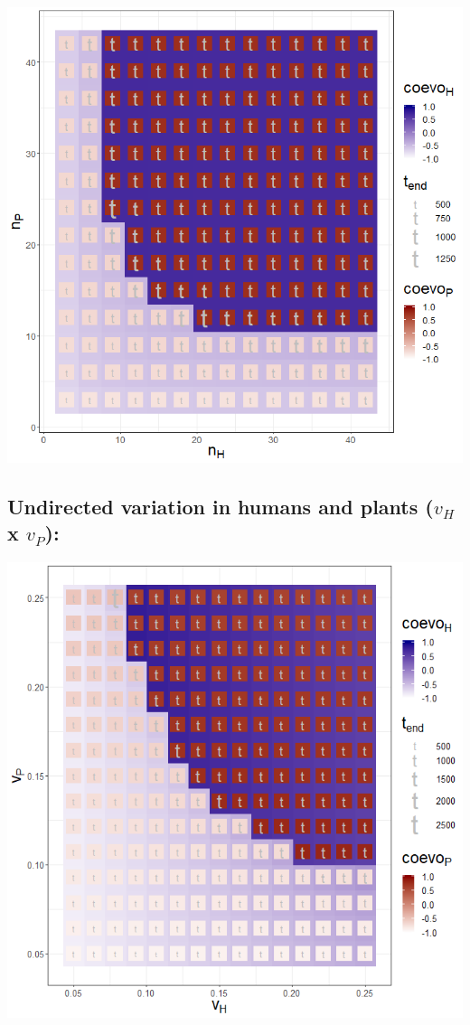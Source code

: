 \documentclass[]{book}
\begin{document}
\includegraphics[width=1\linewidth]{plots/3_twoPar-n.H-n.P_plot}

\newpage

\hypertarget{undirected-variation-in-humans-and-plants-v_h-x-v_p}{%
\subsection{\texorpdfstring{Undirected variation in humans and plants (\(v_{H}\) x \(v_{P}\)):}{Undirected variation in humans and plants (v\_\{H\} x v\_\{P\}):}}\label{undirected-variation-in-humans-and-plants-v_h-x-v_p}}

\includegraphics[width=1\linewidth]{plots/3_twoPar-v.H-v.P_plot}
\end{document}
